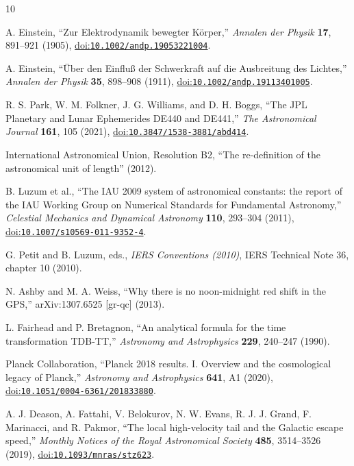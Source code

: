 \documentclass[12pt]{article}
\begin{document}
\begin{thebibliography}{10}
\small
{}
\raggedright
{}

A. Einstein,
``Zur Elektrodynamik bewegter K\"orper,''
\emph{Annalen der Physik} \textbf{17}, 891--921 (1905),
\href{https://doi.org/10.1002/andp.19053221004}{doi:\nolinkurl{10.1002/andp.19053221004}}.

A. Einstein,
``\"Uber den Einflu\ss{} der Schwerkraft auf die Ausbreitung des Lichtes,''
\emph{Annalen der Physik} \textbf{35}, 898--908 (1911),
\href{https://doi.org/10.1002/andp.19113401005}{doi:\nolinkurl{10.1002/andp.19113401005}}.

R. S. Park, W. M. Folkner, J. G. Williams, and D. H. Boggs,
``The JPL Planetary and Lunar Ephemerides DE440 and DE441,''
\emph{The Astronomical Journal} \textbf{161}, 105 (2021),
\href{https://doi.org/10.3847/1538-3881/abd414}{doi:\nolinkurl{10.3847/1538-3881/abd414}}.

International Astronomical Union,
Resolution B2, ``The re-definition of the astronomical unit of length'' (2012).

B. Luzum et al.,
``The IAU 2009 system of astronomical constants: the report of the IAU Working Group on Numerical Standards for Fundamental Astronomy,''
\emph{Celestial Mechanics and Dynamical Astronomy} \textbf{110}, 293--304 (2011),
\href{https://doi.org/10.1007/s10569-011-9352-4}{doi:\nolinkurl{10.1007/s10569-011-9352-4}}.

G. Petit and B. Luzum, eds.,
\emph{IERS Conventions (2010)}, IERS Technical Note 36, chapter 10 (2010).

N. Ashby and M. A. Weiss,
``Why there is no noon-midnight red shift in the GPS,''
arXiv:1307.6525 [gr-qc] (2013).

L. Fairhead and P. Bretagnon,
``An analytical formula for the time transformation TDB-TT,''
\emph{Astronomy and Astrophysics} \textbf{229}, 240--247 (1990).

Planck Collaboration,
``Planck 2018 results. I. Overview and the cosmological legacy of Planck,''
\emph{Astronomy and Astrophysics} \textbf{641}, A1 (2020),
\href{https://doi.org/10.1051/0004-6361/201833880}{doi:\nolinkurl{10.1051/0004-6361/201833880}}.

A. J. Deason, A. Fattahi, V. Belokurov, N. W. Evans, R. J. J. Grand, F. Marinacci, and R. Pakmor,
``The local high-velocity tail and the Galactic escape speed,''
\emph{Monthly Notices of the Royal Astronomical Society} \textbf{485}, 3514--3526 (2019),
\href{https://doi.org/10.1093/mnras/stz623}{doi:\nolinkurl{10.1093/mnras/stz623}}.

\end{thebibliography}
\end{document}
